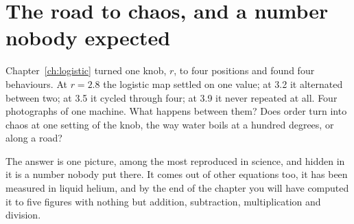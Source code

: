 
\chapter{The road to chaos, and a number nobody expected}
\label{ch:bifurcations}

\noindent
Chapter~\ref{ch:logistic} turned one knob, $r$, to four positions and found
four behaviours. At $r = \num{2.8}$ the logistic map settled on one value; at
\num{3.2} it alternated between two; at \num{3.5} it cycled through four; at
\num{3.9} it never repeated at all. Four photographs of one machine. What
happens between them? Does order turn into chaos at one setting of the knob,
the way water boils at a hundred degrees, or along a road?

The answer is one picture, among the most reproduced in science, and hidden
in it is a number nobody put there. It comes out of other equations too, it
has been measured in liquid helium, and by the end of the chapter you will
have computed it to five figures with nothing but addition, subtraction,
multiplication and division.

\begin{outcomes}
\end{outcomes}

